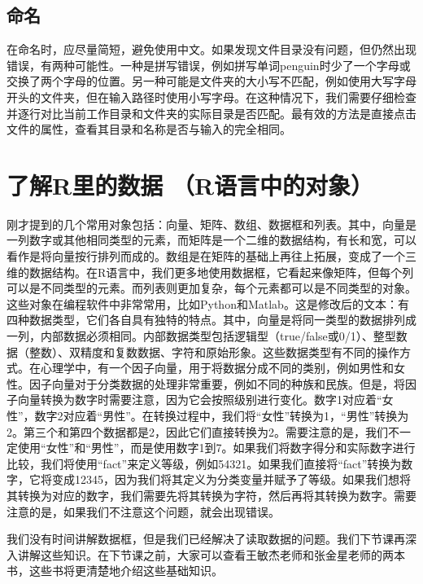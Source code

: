\documentclass[
  oneside]{book}
\begin{document}
\hypertarget{ux547dux540d}{%
\subsection{命名}\label{ux547dux540d}}

在命名时，应尽量简短，避免使用中文。如果发现文件目录没有问题，但仍然出现错误，有两种可能性。一种是拼写错误，例如拼写单词penguin时少了一个字母或交换了两个字母的位置。另一种可能是文件夹的大小写不匹配，例如使用大写字母开头的文件夹，但在输入路径时使用小写字母。在这种情况下，我们需要仔细检查并逐行对比当前工作目录和文件夹的实际目录是否匹配。最有效的方法是直接点击文件的属性，查看其目录和名称是否与输入的完全相同。

\hypertarget{ux4e86ux89e3rux91ccux7684ux6570ux636e-rux8bedux8a00ux4e2dux7684ux5bf9ux8c61}{%
\section{了解R里的数据 （R语言中的对象）}\label{ux4e86ux89e3rux91ccux7684ux6570ux636e-rux8bedux8a00ux4e2dux7684ux5bf9ux8c61}}

刚才提到的几个常用对象包括：向量、矩阵、数组、数据框和列表。其中，向量是一列数字或其他相同类型的元素，而矩阵是一个二维的数据结构，有长和宽，可以看作是将向量按行排列而成的。数组是在矩阵的基础上再往上拓展，变成了一个三维的数据结构。在R语言中，我们更多地使用数据框，它看起来像矩阵，但每个列可以是不同类型的元素。而列表则更加复杂，每个元素都可以是不同类型的对象。这些对象在编程软件中非常常用，比如Python和Matlab。这是修改后的文本：有四种数据类型，它们各自具有独特的特点。其中，向量是将同一类型的数据排列成一列，内部数据必须相同。内部数据类型包括逻辑型（true/false或0/1）、整型数据（整数）、双精度和复数数据、字符和原始形象。这些数据类型有不同的操作方式。在心理学中，有一个因子向量，用于将数据分成不同的类别，例如男性和女性。因子向量对于分类数据的处理非常重要，例如不同的种族和民族。但是，将因子向量转换为数字时需要注意，因为它会按照级别进行变化。数字1对应着``女性''，数字2对应着``男性''。在转换过程中，我们将``女性''转换为1，``男性''转换为2。第三个和第四个数据都是2，因此它们直接转换为2。需要注意的是，我们不一定使用``女性''和``男性''，而是使用数字1到7。如果我们将数字得分和实际数字进行比较，我们将使用``fact''来定义等级，例如54321。如果我们直接将``fact''转换为数字，它将变成12345，因为我们将其定义为分类变量并赋予了等级。如果我们想将其转换为对应的数字，我们需要先将其转换为字符，然后再将其转换为数字。需要注意的是，如果我们不注意这个问题，就会出现错误。

我们没有时间讲解数据框，但是我们已经解决了读取数据的问题。我们下节课再深入讲解这些知识。在下节课之前，大家可以查看王敏杰老师和张金星老师的两本书，这些书将更清楚地介绍这些基础知识。

\printbibliography
\end{document}
